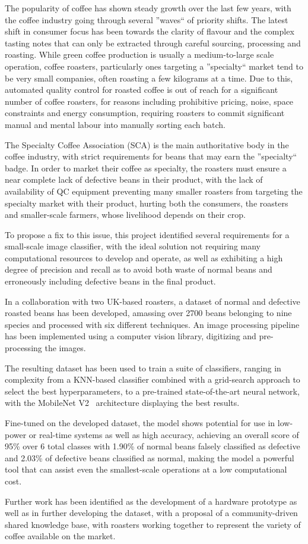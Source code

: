 The popularity of coffee has shown steady growth over the last few years,
with the coffee industry going through several ''waves`` of priority shifts.
The latest shift in consumer focus has been towards the clarity of flavour and the complex tasting notes that
can only be extracted through careful sourcing, processing and roasting.
While green coffee production is usually a medium-to-large scale operation, coffee roasters, particularly ones targeting a
''specialty`` market tend to be very small companies, often roasting a few kilograms at a time.
Due to this, automated quality control for roasted coffee is out of reach for a significant number of coffee roasters,
for reasons including prohibitive pricing, noise, space constraints and energy consumption, requiring roasters to commit
significant manual and mental labour into manually sorting each batch.

The Specialty Coffee Association (SCA) is the main authoritative body in the coffee industry, with strict requirements
for beans that may earn the ''specialty`` badge.
In order to market their coffee as specialty, the roasters must ensure a near complete lack of defective beans in their
product, with the lack of availability of QC equipment preventing many smaller roasters from targeting the specialty market with
their product, hurting both the consumers, the roasters and smaller-scale farmers, whose livelihood depends on their crop.

To propose a fix to this issue, this project identified several requirements for a small-scale image classifier,
with the ideal solution not requiring many computational resources to develop and operate, as well as exhibiting a high degree
of precision and recall as to avoid both waste of normal beans and erroneously including defective beans in the final product.

In a collaboration with two UK-based roasters, a dataset of normal and defective roasted beans has been developed, amassing
over 2700 beans belonging to nine species and processed with six different techniques.
An image processing pipeline has been implemented using a computer vision library, digitizing and pre-processing the images.

The resulting dataset has been used to train a suite of classifiers, ranging in complexity from a KNN-based classifier combined with a grid-search
approach to select the best hyperparameters, to a pre-trained state-of-the-art neural network,
with the MobileNet V2~\cite{mobileNet} architecture displaying the best results.

Fine-tuned on the developed dataset, the model shows potential for use in low-power or real-time systems as well as high accuracy,
achieving an overall score of 95\% over 6 total classes with
1.90\% of normal beans falsely classified as defective and 2.03\% of defective beans classified as normal, making the model
a powerful tool that can assist even the smallest-scale operations at a low computational cost.

Further work has been identified as the development of a hardware prototype as well as in further developing the dataset,
with a proposal of a community-driven shared knowledge base, with roasters working together to represent the variety of coffee
available on the market.
